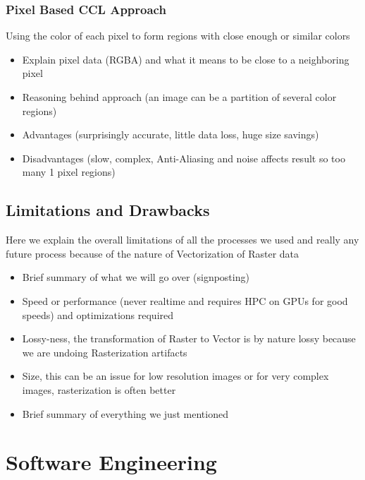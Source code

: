 \documentclass[12pt]{article}
\begin{document}
    \subsubsection{Pixel Based CCL Approach}

    Using the color of each pixel to form regions with close enough or similar colors

    \begin{itemize}
        \item Explain pixel data (RGBA) and what it means to be close to a neighboring pixel
        \item Reasoning behind approach (an image can be a partition of several color regions)
        \item Advantages (surprisingly accurate, little data loss, huge size savings)
        \item Disadvantages (slow, complex, Anti-Aliasing and noise affects result so too many 1 pixel regions)
    \end{itemize}

    \subsection{Limitations and Drawbacks}\label{subsec:limitations-and-drawbacks}

    Here we explain the overall limitations of all the processes we used and really any future process because
    of the nature of Vectorization of Raster data

    \begin{itemize}
        \item Brief summary of what we will go over (signposting)
        \item Speed or performance (never realtime and requires HPC on GPUs for good speeds) and optimizations required
        \item Lossy-ness, the transformation of Raster to Vector is by nature lossy because we are undoing Rasterization
        artifacts
        \item Size, this can be an issue for low resolution images or for very complex images, rasterization is often better
        \item Brief summary of everything we just mentioned
    \end{itemize}

    \pagebreak


    \section{Software Engineering}\label{sec:software-engineering}
\end{document}
